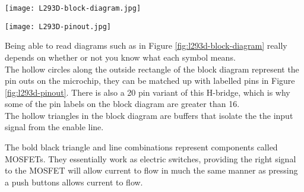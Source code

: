 \documentclass[../TinyBot.tex]{subfiles}
\begin{document}
\begin{center}
    \centering

    \begin{minipage}{0.5\textwidth}\vspace{0pt}
        \texttt{[image: L293D-block-diagram.jpg]}
        \label{fig:l293d-block-diagram}
        
    \end{minipage}
    \begin{minipage}{0.2\textwidth}\vspace{0pt}
        
    \end{minipage}
    \begin{minipage}{0.3\textwidth}\vspace{0pt}
        \centering
        \texttt{[image: L293D-pinout.jpg]}
        \label{fig:l293d-pinout}
    \end{minipage}
    \label{fig:l293d}
\end{center}



Being able to read diagrams such as in Figure \ref{fig:l293d-block-diagram} really depends on whether or not you know what each symbol means. \\


The hollow circles along the outside rectangle of the block diagram represent the pin outs on the microchip, they can be matched up with labelled pins in Figure \ref{fig:l293d-pinout}. There is also a 20 pin variant of this H-bridge, which is why some of the pin labels on the block diagram are greater than 16.\\


The hollow triangles in the block diagram are buffers that isolate the the input signal from the enable line. 



The bold black triangle and line combinations represent components called MOSFETs. They essentially work as electric switches, providing the right signal to the MOSFET will allow current to flow in much the same manner as pressing a push buttons allows current to flow.
\end{document}
